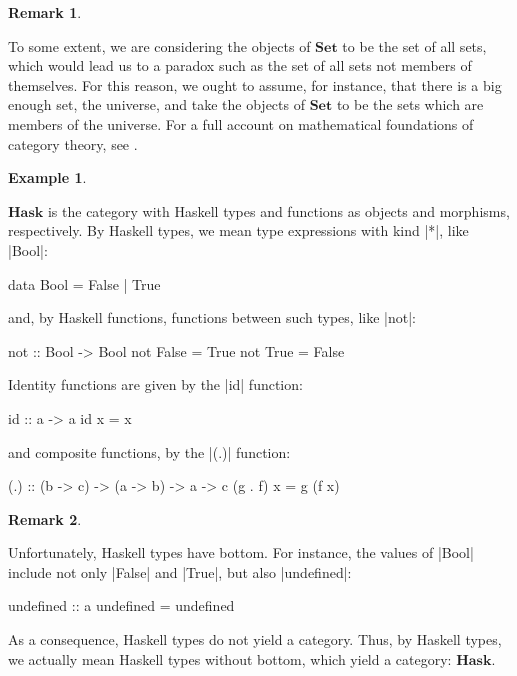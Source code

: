 \documentclass[11pt,letterpaper]{article}
\theoremstyle{definition}
\newtheorem{example}{Example}[section]
\newtheorem{remark}{Remark}[section]
\newcommand{\catbf}[1]{\ensuremath{\mathbf{#1}}\xspace}
\newcommand{\hask}{\catbf{Hask}}
\newcommand{\set}{\catbf{Set}}
\begin{document}
\begin{remark}
  \label{re:foundations}


  To some extent, we are considering the objects of \set to be the set
  of all sets, which would lead us to a paradox such as the set of all
  sets not members of themselves. For this reason, we ought to assume,
  for instance, that there is a big enough set, the universe, and take
  the objects of \set to be the sets which are members of the
  universe. For a full account on mathematical foundations of category
  theory, see \parencites[§~1.8]{awodey-2010}[§~I.6]{maclane-1998}.

\end{remark}

\begin{example}
  \label{ex:hask}


  \hask is the category with Haskell types and functions as objects
  and morphisms, respectively. By Haskell types, we mean type
  expressions with kind |*|, like |Bool|:
  \begin{code}
data Bool = False | True
  \end{code}
  and, by Haskell functions, functions between such types, like |not|:
  \begin{code}
not :: Bool -> Bool
not False = True
not True  = False
  \end{code}
  Identity functions are given by the |id| function:
  \begin{code}
id :: a -> a
id x = x
\end{code}
  and composite functions, by the |(.)| function:
\begin{code}
(.) :: (b -> c) -> (a -> b) -> a -> c
(g . f) x = g (f x)
  \end{code}

\end{example}

\begin{remark}
  \label{re:hask}


  Unfortunately, Haskell types have bottom. For instance, the values
  of |Bool| include not only |False| and |True|, but also |undefined|:
  \begin{code}
undefined :: a
undefined = undefined
  \end{code}
  As a consequence, Haskell types do not yield a category. Thus, by
  Haskell types, we actually mean Haskell types without bottom, which
  yield a category: \hask.

\end{remark}
\end{document}
